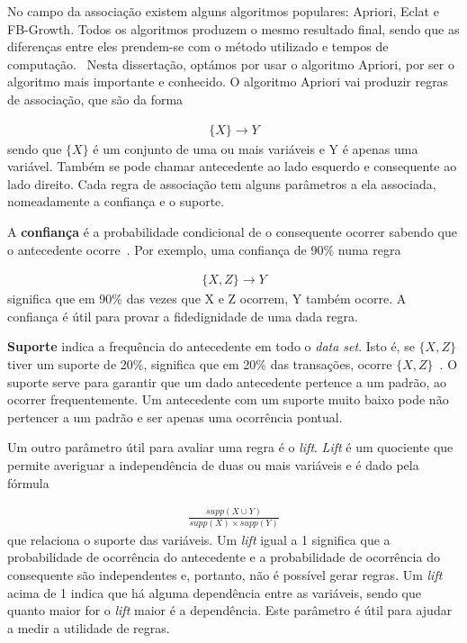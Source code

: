 No campo da associação existem alguns algoritmos populares: Apriori, Eclat e FB-Growth. Todos os algoritmos produzem o mesmo resultado final, sendo que as diferenças entre eles prendem-se com o método utilizado e tempos de computação.~\cite{algs} Nesta dissertação, optámos por usar o algoritmo Apriori, por ser o algoritmo mais importante e conhecido. O algoritmo Apriori vai produzir regras de associação, que são da forma

\begin{align*}
\{X\} \rightarrow Y 
\end{align*}
sendo que $\{X\}$ é um conjunto de uma ou mais variáveis e Y é apenas uma variável. Também se pode chamar antecedente ao lado esquerdo e consequente ao lado direito. Cada regra de associação tem alguns parâmetros a ela associada, nomeadamente a confiança e o suporte.

A \textbf{confiança} é a probabilidade condicional de o consequente ocorrer sabendo que o antecedente ocorre~\cite{oracle}. Por exemplo, uma confiança de 90\% numa regra 

\begin{align*}
\{X, Z\} \rightarrow Y  
\end{align*}
significa que em 90\% das vezes que X e Z ocorrem, Y também ocorre. A confiança é útil para provar a fidedignidade de uma dada regra.

\textbf{Suporte} indica a frequência do antecedente em todo o \textit{data set}. Isto é, se $ \{X, Z\} $ tiver um suporte de 20\%, significa que em 20\% das transações, ocorre $\{X, Z\}$~\cite{oracle}. O suporte serve para garantir que um dado antecedente pertence a um padrão, ao ocorrer frequentemente. Um antecedente com um suporte muito baixo pode não pertencer a um padrão e ser apenas uma ocorrência pontual.

Um outro parâmetro útil para avaliar uma regra é o \textit{lift}. \textit{Lift} é um quociente que permite averiguar a independência de duas ou mais variáveis e é dado pela fórmula 

\begin{align*}
\frac{supp(X\cup Y)}{supp(X)\times supp(Y)}
\end{align*}
que relaciona o suporte das variáveis. Um \textit{lift} igual a 1 significa que a probabilidade de ocorrência do antecedente e a probabilidade de ocorrência do consequente são independentes e, portanto, não é possível gerar regras. Um \textit{lift} acima de 1 indica que há alguma dependência entre as variáveis, sendo que quanto maior for o \textit{lift} maior é a dependência. Este parâmetro é útil para ajudar a medir a utilidade de regras.\newline



